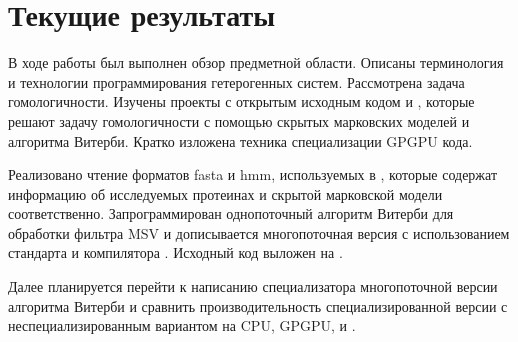 \section{Текущие результаты}
В ходе работы был выполнен обзор предметной области.
Описаны терминология и технологии программирования гетерогенных систем.
Рассмотрена задача гомологичности.
Изучены проекты с открытым исходным кодом  и , 
которые решают задачу гомологичности с помощью скрытых марковских моделей и 
алгоритма Витерби.
Кратко изложена техника специализации GPGPU кода.

Реализовано чтение форматов fasta и hmm, используемых в , которые 
содержат информацию об исследуемых протеинах и скрытой марковской модели 
соответственно.
Запрограммирован однопоточный алгоритм Витерби для обработки фильтра MSV и 
дописывается многопоточная версия с использованием стандарта  и 
компилятора .
Исходный код выложен на \href{https://github.com/IvanTyulyandin/HMM_FASTA_Viterbi}{}.

Далее планируется перейти к написанию специализатора многопоточной версии 
алгоритма Витерби и сравнить производительность специализированной версии с 
неспециализированным вариантом на CPU, GPGPU,  и .
